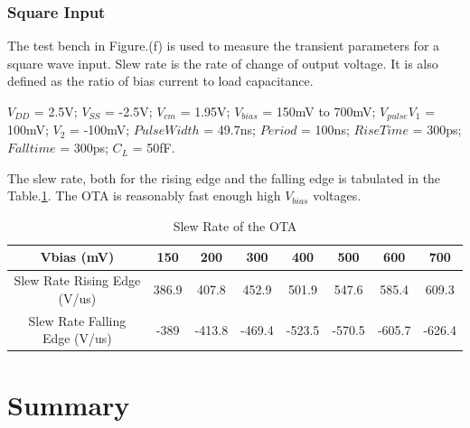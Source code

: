 \subsubsection{Square Input}
The test bench in Figure.(f) is used to measure the transient parameters for a square wave input. Slew rate is the rate of change of output voltage. It is also defined as the ratio of bias current to load capacitance.

$V_{DD}$ = 2.5V; $V_{SS}$ = -2.5V; $V_{cm}$ = 1.95V; $V_{bias}$ = 150mV to 700mV;  $V_{pulse} V_1$ = 100mV; $V_2$ = -100mV; $Pulse Width$ = 49.7ns; $Period$ = 100ns; $Rise Time$ = 300ps; $Fall time$ = 300ps; $C_{L}$ = 50fF.

The slew rate, both for the rising edge and the falling edge is tabulated in the Table.\ref{tab:OTA_Slew}. The OTA is reasonably fast enough high $V_{bias}$ voltages.

\begin{table} [H]
\centering
\begin{tabular}{@{}cccccccc@{}}
\toprule
Vbias (mV)					& 150			& 200			& 300			& 400			& 500			& 600			& 700 \\ \midrule
Slew Rate Rising Edge (V/us)			& 386.9		& 407.8		& 452.9		& 501.9 	& 547.6		& 585.4		& 609.3 \\
Slew Rate Falling Edge (V/us)			& -389		& -413.8		& -469.4		& -523.5		& -570.5		& -605.7		& -626.4 \\
\bottomrule
\end{tabular}
\caption{Slew Rate of the OTA}
\label{tab:OTA_Slew}
\end{table}

\section{Summary}